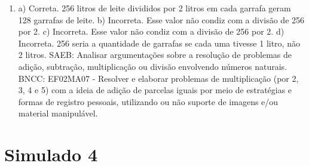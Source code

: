 \begin{enumerate}
\item
a) Correta. 256 litros de leite divididos por 2 litros em cada garrafa geram 128 garrafas de leite.
b) Incorreta. Esse valor não condiz com a divisão de 256 por 2.
c) Incorreta. Esse valor não condiz com a divisão de 256 por 2.
d) Incorreta. 256 seria a quantidade de garrafas se cada uma tivesse 1 litro, não 2 litros.
SAEB: Analisar argumentações sobre a resolução de problemas de
adição, subtração, multiplicação ou divisão envolvendo números naturais.
BNCC: EF02MA07 - Resolver e elaborar problemas de multiplicação (por 2,
3, 4 e 5) com a ideia de adição de parcelas iguais por meio de
estratégias e formas de registro pessoais, utilizando ou não suporte de
imagens e/ou material manipulável.
\end{enumerate}

\section*{Simulado 4}

